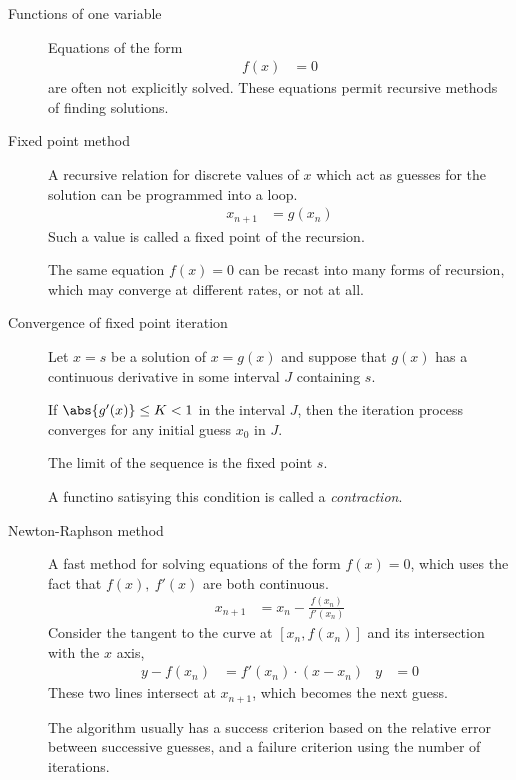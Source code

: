 \begin{description}
    \item[Functions of one variable] Equations of the form
        \begin{align}
            f(x) & = 0
        \end{align}
        are often not explicitly solved. These equations permit recursive methods of
        finding solutions.

    \item[Fixed point method] A recursive relation for discrete values of $ x $ which
        act as guesses for the solution can be programmed into a loop.
        \begin{align}
            x_{n+1} & = g(x_n)
        \end{align}
        Such a value is called a fixed point of the recursion. \par
        The same equation $ f(x) = 0 $ can be recast into many forms of recursion, which
        may converge at different rates, or not at all.

    \item[Convergence of fixed point iteration] Let $ x = s $ be a solution of
        $ x = g(x) $ and suppose that $ g(x) $ has a continuous derivative in some
        interval $ J $ containing $ s $. \par
        If $ \abs{g'(x)} \leq K < 1 $ in the interval $ J $, then the iteration process
        converges for any initial guess $ x_0 $ in $ J $. \par
        The limit of the sequence is the fixed point $ s $. \par
        A functino satisying this condition is called a \emph{contraction}.

    \item[Newton-Raphson method] A fast method for solving equations of the form
        $ f(x) = 0 $, which uses the fact that $f(x),\ f'(x) $ are both continuous.
        \begin{align}
            x_{n+1} & = x_n - \frac{f(x_n)}{f'(x_n)}
        \end{align}
        Consider the tangent to the curve at $ [x_n, f(x_n)] $ and its intersection with
        the $ x $ axis,
        \begin{align}
            y - f(x_n) & = f'(x_n) \cdot (x - x_n) &
            y          & = 0
        \end{align}
        These two lines intersect at $ x_{n+1} $, which becomes the next guess. \par
        The algorithm usually has a success criterion based on the relative error between
        successive guesses, and a failure criterion using the number of iterations.


\end{description}
